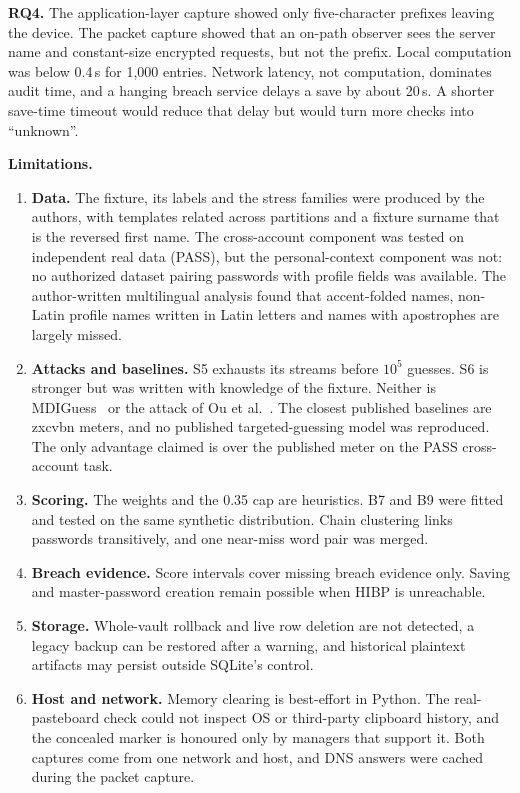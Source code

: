 \documentclass[preprint,12pt]{elsarticle}
\begin{document}
\textbf{RQ4.} The application-layer capture showed only five-character prefixes leaving the device. The packet capture showed that an on-path observer sees the server name and constant-size encrypted requests, but not the prefix. Local computation was below 0.4\,s for 1,000 entries. Network latency, not computation, dominates audit time, and a hanging breach service delays a save by about 20\,s. A shorter save-time timeout would reduce that delay but would turn more checks into ``unknown''.

\textbf{Limitations.}
\begin{enumerate}
\item \textbf{Data.} The fixture, its labels and the stress families were produced by the authors, with templates related across partitions and a fixture surname that is the reversed first name. The cross-account component was tested on independent real data (PASS), but the personal-context component was not: no authorized dataset pairing passwords with profile fields was available. The author-written multilingual analysis found that accent-folded names, non-Latin profile names written in Latin letters and names with apostrophes are largely missed.
\item \textbf{Attacks and baselines.} S5 exhausts its streams before $10^5$ guesses. S6 is stronger but was written with knowledge of the fixture. Neither is MDIGuess~\cite{mdiguess} or the attack of Ou et al.~\cite{ou2026}. The closest published baselines are zxcvbn meters, and no published targeted-guessing model was reproduced. The only advantage claimed is over the published meter on the PASS cross-account task.
\item \textbf{Scoring.} The weights and the 0.35 cap are heuristics. B7 and B9 were fitted and tested on the same synthetic distribution. Chain clustering links passwords transitively, and one near-miss word pair was merged.
\item \textbf{Breach evidence.} Score intervals cover missing breach evidence only. Saving and master-password creation remain possible when HIBP is unreachable.
\item \textbf{Storage.} Whole-vault rollback and live row deletion are not detected, a legacy backup can be restored after a warning, and historical plaintext artifacts may persist outside SQLite's control.
\item \textbf{Host and network.} Memory clearing is best-effort in Python. The real-pasteboard check could not inspect OS or third-party clipboard history, and the concealed marker is honoured only by managers that support it. Both captures come from one network and host, and DNS answers were cached during the packet capture.

\end{enumerate}
\end{document}
